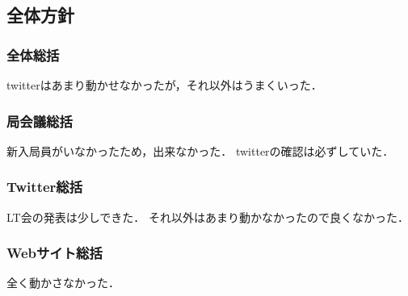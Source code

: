 \subsection*{全体方針}


\subsubsection*{全体総括}

twitterはあまり動かせなかったが，それ以外はうまくいった．

\subsubsection*{局会議総括}

新入局員がいなかったため，出来なかった．
twitterの確認は必ずしていた．

\subsubsection*{Twitter総括}

LT会の発表は少しできた．
それ以外はあまり動かなかったので良くなかった．

\subsubsection*{Webサイト総括}

全く動かさなかった．